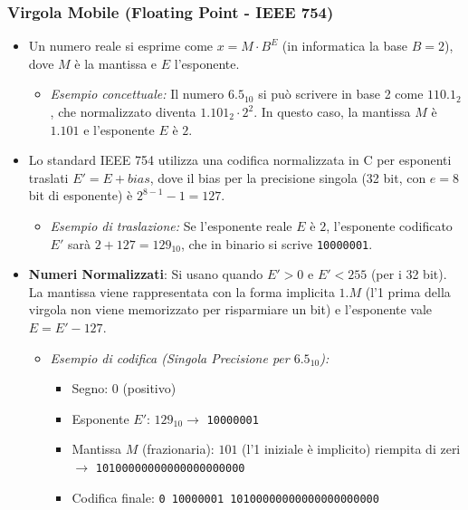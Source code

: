 \documentclass[12pt, a4paper]{article}
\begin{document}
\subsubsection*{Virgola Mobile (Floating Point - IEEE 754)}
\begin{itemize}
    \item Un numero reale si esprime come $x = M \cdot B^E$ (in informatica la base $B=2$), dove $M$ è la mantissa e $E$ l'esponente.
    \begin{itemize}
        \item \textit{Esempio concettuale:} Il numero $6.5_{10}$ si può scrivere in base 2 come $110.1_2$, che normalizzato diventa $1.101_2 \cdot 2^2$. In questo caso, la mantissa $M$ è $1.101$ e l'esponente $E$ è $2$.
    \end{itemize}
    
    \item Lo standard IEEE 754 utilizza una codifica normalizzata in C per esponenti traslati $E' = E + \textit{bias}$, dove il bias per la precisione singola (32 bit, con $e=8$ bit di esponente) è $2^{8-1} - 1 = 127$.
    \begin{itemize}
        \item \textit{Esempio di traslazione:} Se l'esponente reale $E$ è $2$, l'esponente codificato $E'$ sarà $2 + 127 = 129_{10}$, che in binario si scrive \texttt{10000001}.
    \end{itemize}

    \item \textbf{Numeri Normalizzati}: Si usano quando $E' > 0$ e $E' < 255$ (per i 32 bit). La mantissa viene rappresentata con la forma implicita $1.M$ (l'1 prima della virgola non viene memorizzato per risparmiare un bit) e l'esponente vale $E = E' - 127$.
    \begin{itemize}
        \item \textit{Esempio di codifica (Singola Precisione per $6.5_{10}$):} 
        \begin{itemize}
            \item Segno: $0$ (positivo)
            \item Esponente $E'$: $129_{10} \rightarrow$ \texttt{10000001}
            \item Mantissa $M$ (frazionaria): $101$ (l'1 iniziale è implicito) riempita di zeri $\rightarrow$ \texttt{10100000000000000000000}
            \item Codifica finale: \texttt{0 10000001 10100000000000000000000}
        \end{itemize}
    \end{itemize}


\end{itemize}
\end{document}
